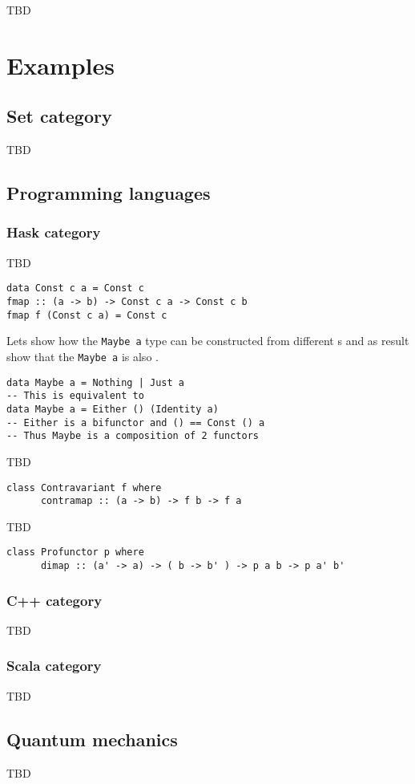 TBD

\section{Examples}

\subsection{\textbf{Set} category}
TBD

\subsection{Programming languages}

\subsubsection{\textbf{Hask} category}
TBD

\begin{example}
\label{ex:terminal_object_cat_hask}
\begin{verbatim}
data Const c a = Const c
fmap :: (a -> b) -> Const c a -> Const c b
fmap f (Const c a) = Const c
\end{verbatim}
\end{example}

\begin{example}
\label{ex:maybe_functor}
Lets show how the \texttt{Maybe a} type can be
constructed from different 
s and as result show that the
\texttt{Maybe a} is also 
. 
\begin{verbatim}
data Maybe a = Nothing | Just a
-- This is equivalent to
data Maybe a = Either () (Identity a)
-- Either is a bifunctor and () == Const () a 
-- Thus Maybe is a composition of 2 functors 
\end{verbatim}
\end{example}

\begin{example}
\label{ex:contravariant_functor_hask}
TBD
\begin{verbatim}
class Contravariant f where
      contramap :: (a -> b) -> f b -> f a
\end{verbatim}
\end{example}

\begin{example}
\label{ex:contravariant_functor_hask}
TBD
\begin{verbatim}
class Profunctor p where
      dimap :: (a' -> a) -> ( b -> b' ) -> p a b -> p a' b'
\end{verbatim}
\end{example}


\subsubsection{\textbf{C++} category}
TBD

\subsubsection{\textbf{Scala} category}
TBD

\subsection{Quantum mechanics}
TBD
